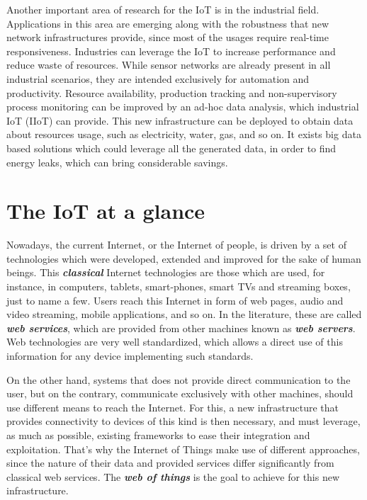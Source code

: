 Another important area of research for the IoT is in the industrial field\cite{lidaxu2014iiotsurvey}.
Applications in this area are emerging along with the robustness that new network infrastructures provide, since most of the usages require real-time responsiveness.
Industries can leverage the IoT to increase performance and reduce waste of resources.
While sensor networks are already present in all industrial scenarios, they are intended exclusively for automation and productivity.
Resource availability, production tracking and non-supervisory process monitoring can be improved by an ad-hoc data analysis, which industrial IoT (IIoT) can provide.
This new infrastructure can be deployed to obtain data about resources usage, such as electricity, water, gas, and so on.
It exists big data based solutions which could leverage all the generated data, in order to find energy leaks, which can bring considerable savings. 



\section{The IoT at a glance}
Nowadays, the current Internet, or the Internet of people, is driven by a set of technologies which were developed, extended and improved for the sake of human beings.
This \textit{\textbf{classical}} Internet technologies are those which are used, for instance, in computers, tablets, smart-phones, smart TVs and streaming boxes, just to name a few.
Users reach this Internet in form of web pages, audio and video streaming, mobile applications, and so on.
In the literature, these are called \textit{\textbf{web services}}, which are provided from other machines known as \textit{\textbf{web servers}}.
Web technologies are very well standardized, which allows a direct use of this information for any device implementing such standards.

On the other hand, systems that does not provide direct communication to the user, but on the contrary, communicate exclusively with other machines, should use different means to reach the Internet.
For this, a new infrastructure that provides connectivity to devices of this kind is then necessary, and must leverage, as much as possible, existing frameworks to ease their integration and exploitation.
That's why the Internet of Things make use of different approaches, since the nature of their data and provided services differ  significantly from classical web services.
The \textit{\textbf{web of things}}\cite{duquennoy2009webofthings} is the goal to achieve for this new infrastructure.

